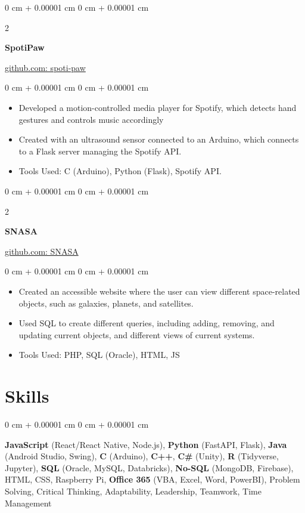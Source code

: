 \documentclass[10pt, letterpaper]{article}
\newenvironment{highlights}{
    \begin{itemize}[
        topsep=0.10 cm,
        parsep=0.10 cm,
        partopsep=0pt,
        itemsep=0pt,
        leftmargin=0 cm + 10pt
    ]
}{
    \end{itemize}
} %
\newenvironment{onecolentry}{
    \begin{adjustwidth}{
        0 cm + 0.00001 cm
    }{
        0 cm + 0.00001 cm
    }
}{
    \end{adjustwidth}
} %
\newenvironment{twocolentry}[2][]{
    \onecolentry
    \def\secondColumn{#2}
    \setcolumnwidth{\fill, 4.5 cm}
    \begin{paracol}{2}
}{
    \switchcolumn \raggedleft \secondColumn
    \end{paracol}
    \endonecolentry
} %
\begin{document}
        \begin{twocolentry}
            {\href{https://github.com/ayushtvora/spoti-paw}{github.com: spoti-paw}}
            \textbf{SpotiPaw}
        \end{twocolentry}
        \vspace{0.10 cm}
        \begin{onecolentry}
            \begin{highlights}
                \item Developed a motion-controlled media player for Spotify, which detects hand gestures and controls music accordingly
                \item Created with an ultrasound sensor connected to an Arduino, which connects to a Flask server managing the Spotify API. 
                \item Tools Used: C (Arduino), Python (Flask), Spotify API. 
            \end{highlights}
        \end{onecolentry}

        \vspace{0.2 cm}

        \begin{twocolentry}
        {\href{https://github.com/ayushtvora/SNASA}{github.com: SNASA}}
            \textbf{SNASA}
        \end{twocolentry}
        \vspace{0.10 cm}
        \begin{onecolentry}
            \begin{highlights}
                \item Created an accessible website where the user can view different space-related objects, such as galaxies, planets, and satellites.
                \item Used SQL to create different queries, including adding, removing, and updating current objects, and different views of current systems.
                \item Tools Used: PHP, SQL (Oracle), HTML, JS 
            \end{highlights}
        \end{onecolentry}



    \section{Skills}
        \begin{onecolentry}
            \textbf{JavaScript} (React/React Native, Node.js), 
            \textbf{Python} (FastAPI, Flask), 
            \textbf{Java} (Android Studio, Swing), 
            \textbf{C} (Arduino), 
            \textbf{C++}, 
            \textbf{C\#} (Unity), 
            \textbf{R} (Tidyverse, Jupyter), 
            \textbf{SQL} (Oracle, MySQL, Databricks), 
            \textbf{No-SQL} (MongoDB, Firebase), 
            HTML, CSS, Raspberry Pi, 
            \textbf{Office 365} (VBA, Excel, Word, PowerBI), Problem Solving, Critical Thinking, Adaptability, Leadership, Teamwork, Time Management
        \end{onecolentry}
\end{document}
